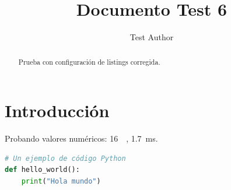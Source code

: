 \documentclass[conference,a4paper]{IEEEtran}
\begin{document}
\title{Documento Test 6}
\author{Test Author}
\maketitle

\begin{abstract}
Prueba con configuración de listings corregida.
\end{abstract}

\section{Introducción}
Probando valores numéricos: \SI{16}{\giga\byte}, \SI{1.7}{\milli\second}.

\begin{lstlisting}[language=Python]
# Un ejemplo de código Python
def hello_world():
    print("Hola mundo")
\end{lstlisting}
\end{document}
